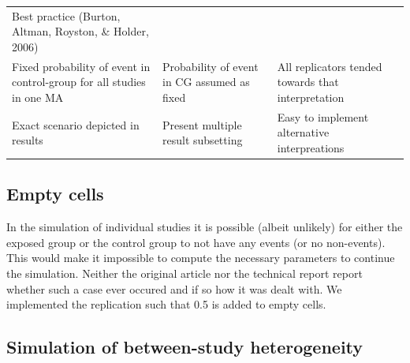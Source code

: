 \documentclass[
  english,
  doc,floatsintext,draftall]{apa6}
\begin{document}
\begin{longtable}[]{@{}lll@{}}
\begin{minipage}[t]{0.25\columnwidth}
Best practice (Burton, Altman, Royston, \& Holder, 2006)\strut
\end{minipage}\tabularnewline
\begin{minipage}[t]{0.33\columnwidth}\raggedright
Fixed probability of event in control-group for all studies in one MA\strut
\end{minipage} & \begin{minipage}[t]{0.33\columnwidth}\raggedright
Probability of event in CG assumed as fixed\strut
\end{minipage} & \begin{minipage}[t]{0.25\columnwidth}\raggedright
All replicators tended towards that interpretation\strut
\end{minipage}\tabularnewline
\begin{minipage}[t]{0.33\columnwidth}\raggedright
Exact scenario depicted in results\strut
\end{minipage} & \begin{minipage}[t]{0.33\columnwidth}\raggedright
Present multiple result subsetting\strut
\end{minipage} & \begin{minipage}[t]{0.25\columnwidth}\raggedright
Easy to implement alternative interpreations\strut
\end{minipage}\tabularnewline
\bottomrule
\end{longtable}

\hypertarget{empty-cells}{%
\subsection{Empty cells}\label{empty-cells}}

In the simulation of individual studies it is possible (albeit unlikely) for either the exposed group or the control group to not have any events (or no non-events).
This would make it impossible to compute the necessary parameters to continue the simulation.
Neither the original article nor the technical report report whether such a case ever occured and if so how it was dealt with.
We implemented the replication such that 0.5 is added to empty cells.

\hypertarget{simulation-of-between-study-heterogeneity}{%
\subsection{Simulation of between-study heterogeneity}\label{simulation-of-between-study-heterogeneity}}
\end{document}
